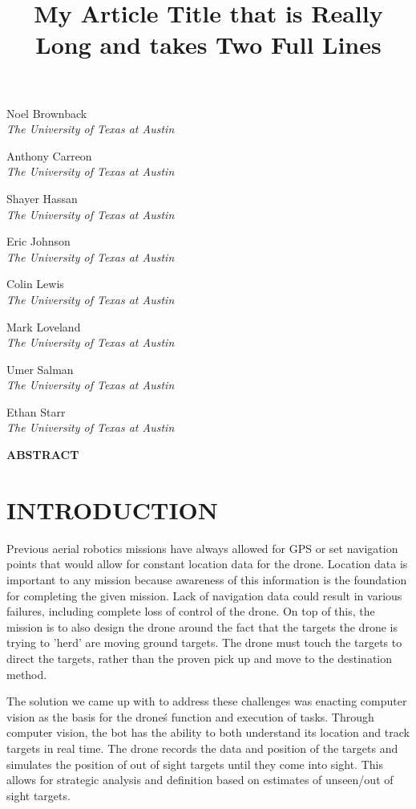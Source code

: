 \documentclass[12pt,letterpaper]{article}
\title{My Article Title that is Really Long and takes Two Full Lines}
\newenvironment{nscenter}
 {\parskip=0pt\par\nopagebreak\centering}
 {\par\noindent\ignorespacesafterend}
\newcommand{\affiliatedauthor}[2]{
\begin{nscenter}
	#1 \\ \textit{#2}
\end{nscenter}
}
\renewcommand{\abstractname}{ABSTRACT}
\renewenvironment{abstract}
 {\vspace{-0.5ex}
	\small
	\begin{center}
		\bfseries \abstractname\vspace{-4ex}\vspace{0pt}
	\end{center}
	\list{}{
		\setlength{\leftmargin}{0.5in}
		\setlength{\rightmargin}{\leftmargin}
	}
	\item\relax}
 {\endlist}
\begin{document}
\begin{center}
	\textbf{\LARGE{\thetitle}}
\end{center}

\affiliatedauthor{Noel Brownback}{The University of Texas at Austin}
\affiliatedauthor{Anthony Carreon}{The University of Texas at Austin}
\affiliatedauthor{Shayer Hassan}{The University of Texas at Austin}
\affiliatedauthor{Eric Johnson}{The University of Texas at Austin}
\affiliatedauthor{Colin Lewis}{The University of Texas at Austin}
\affiliatedauthor{Mark Loveland}{The University of Texas at Austin}
\affiliatedauthor{Umer Salman}{The University of Texas at Austin}
\affiliatedauthor{Ethan Starr}{The University of Texas at Austin}


\begin{abstract}
\lipsum[1]
\end{abstract}


\section*{INTRODUCTION}
	Previous aerial robotics missions have always allowed for GPS or set navigation points that would allow for constant location data for the drone. Location data is important to any mission because awareness of this information is the foundation for completing the given mission. Lack of navigation data could result in various failures, including complete loss of control of the drone. On top of this, the mission is to also design the drone around the fact that the targets the drone is trying to 'herd' are moving ground targets. The drone must touch the targets to direct the targets, rather than the proven pick up and move to the destination method.

	The solution we came up with to address these challenges was enacting computer vision as the basis for the drone\'s function and execution of tasks. Through computer vision, the bot has the ability to both understand its location and track targets in real time. The drone records the data and position of the targets and simulates the position of out of sight targets until they come into sight. This allows for strategic analysis and definition based on estimates of unseen/out of sight targets.
\end{document}
